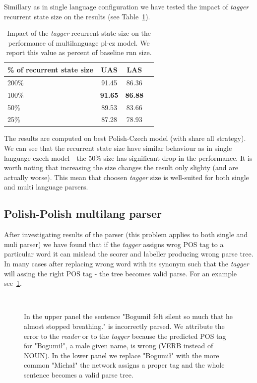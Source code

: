 Simillary as in single language configuration we have tested the impact of \emph{tagger}
recurrent state size on the results (see Table~\ref{tab:birnn_multi_size}).

\begin{table}[!htbp]
    \centering
    \begin{tabular}{l c c c}
        \% of recurrent state size & UAS & LAS \\ \hline 
        200\% & 91.45 & 86.36\\
        100\% & \textbf{91.65} & \textbf{86.88}\\
        50\% & 89.53 & 83.66\\
        25\% & 87.28 & 78.93
    \end{tabular}
    \label{tab:birnn_multi_size}
    \caption{Impact of the \emph{tagger} recurrent state size on the performance
    of multilanguage pl-cz model.
    We report this value as percent of baseline rnn size.}
\end{table}

The results are computed on best Polish-Czech model (with share all strategy). We can see
that the recurrent state size have similar behaviour as in single language czech model - 
the 50\% size has significant drop in the performance. It is worth noting that
increasing the size changes the result only slighty (and are actually worse).
This mean that choosen \emph{tagger} size is well-suited for both single and multi
language parsers.

\subsection{Polish-Polish multilang parser}
After investigating results of the parser (this problem applies to both single
and muli parser) we have found that if the \emph{tagger} assigns wrog POS tag to
a particular word it can mislead the scorer and labeller producing wrong parse tree.
In many cases after replacing wrong word with its synonym such that the \emph{tagger}
will assing the right POS tag - the tree becomes valid parse. For an example see~\ref{fig:pos_bad_good}.
\begin{figure}[t]
  \centering
  \\[5pt]
  \label{fig:pos_bad_good}
  \caption{In the upper panel the sentence "Bogumił felt silent so
    much that he almost stopped breathing." is incorrectly parsed.
    We attribute the error to the \emph{reader} or to the \emph{tagger} because the predicted POS
    tag for "Bogumił", a male given name, is wrong (VERB instead of
    NOUN). In the lower panel we replace "Bogumił" with the  more common "Michał" the network assigns
    a proper tag and the whole sentence becomes a valid parse tree.} 
\end{figure}
